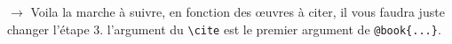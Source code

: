 \documentclass[11pt]{article}				%
\begin{document}
\begin{figure}[h!]
	\centering
	 \hfill

\end{figure}

$\rightarrow$ Voila la marche à suivre, en fonction des œuvres à citer, il vous faudra juste changer l'étape 3. l'argument du \verb|\cite| est le premier argument de \verb|@book{...}|.
\end{document}
